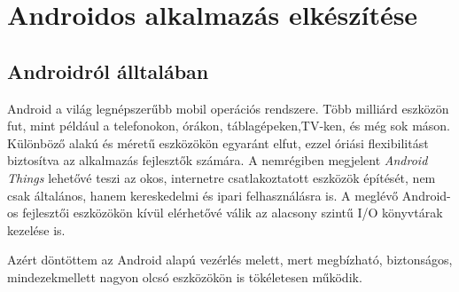 \documentclass[../main.tex]{subfiles}
\begin{document}
\section{Androidos alkalmazás elkészítése}
    \subsection{Androidról álltalában}
        Android a világ legnépszerűbb mobil operációs rendszere. Több milliárd eszközön fut, mint például a telefonokon, órákon, táblagépeken,TV-ken, és még sok máson. 
        Különböző alakú és méretű eszközökön egyaránt elfut, ezzel óriási flexibilitást biztosítva az alkalmazás fejlesztők számára. 
        A nemrégiben megjelent \textit{Android Things} lehetővé teszi az okos, internetre csatlakoztatott eszközök építését, nem csak általános, hanem kereskedelmi és ipari felhasználásra is. A meglévő Android-os fejlesztői eszközökön kívül elérhetővé válik az alacsony szintű I/O könyvtárak kezelése is. 
        
        Azért döntöttem az Android alapú vezérlés melett, mert megbízható, biztonságos, mindezekmellett nagyon olcsó eszközökön is tökéletesen működik. 
        
\end{document}
